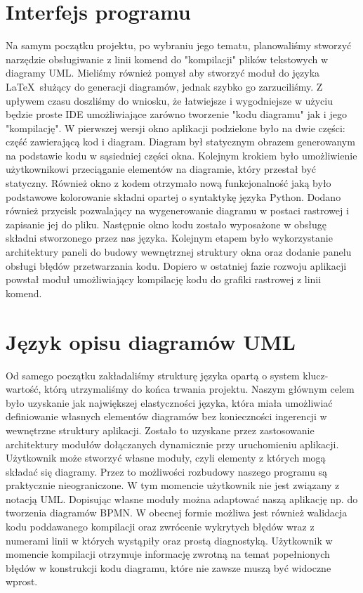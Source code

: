 \section{Interfejs programu}
Na samym początku projektu, po wybraniu jego tematu, planowaliśmy stworzyć narzędzie obsługiwanie z linii komend do "kompilacji" plików tekstowych w diagramy UML. Mieliśmy również pomysł aby stworzyć moduł do języka \LaTeX\ służący do generacji diagramów, jednak szybko go zarzuciliśmy.
Z upływem czasu doszliśmy do wniosku, że łatwiejsze i wygodniejsze w użyciu będzie proste IDE umożliwiające zarówno tworzenie "kodu diagramu" jak i jego "kompilację". W pierwszej wersji okno aplikacji podzielone było na dwie części: część zawierającą kod i diagram. Diagram był statycznym obrazem generowanym na podstawie kodu w sąsiedniej części okna.
Kolejnym krokiem było umożliwienie użytkownikowi przeciąganie elementów na diagramie, który przestał być statyczny. Również okno z kodem otrzymało nową funkcjonalność jaką było podstawowe kolorowanie składni opartej o syntaktykę języka Python. Dodano również przycisk pozwalający na wygenerowanie diagramu w postaci rastrowej i zapisanie jej do pliku.
Następnie okno kodu zostało wyposażone w obsługę składni stworzonego przez nas języka. Kolejnym etapem było wykorzystanie architektury paneli do budowy wewnętrznej struktury okna oraz dodanie panelu obsługi błędów przetwarzania kodu. Dopiero w ostatniej fazie rozwoju aplikacji powstał moduł umożliwiający kompilację kodu do grafiki rastrowej z linii komend.
\section{Język opisu diagramów UML}
Od samego początku zakładaliśmy strukturę języka opartą o system klucz-wartość, którą utrzymaliśmy do końca trwania projektu. Naszym głównym celem było uzyskanie jak największej elastyczności języka, która miała umożliwiać definiowanie własnych elementów diagramów bez konieczności ingerencji w wewnętrzne struktury aplikacji. Zostało to uzyskane przez zastosowanie architektury modułów dołączanych dynamicznie przy uruchomieniu aplikacji. Użytkownik może stworzyć własne moduły, czyli elementy z których mogą składać się diagramy. Przez to możliwości rozbudowy naszego programu są praktycznie nieograniczone. W tym momencie użytkownik nie jest związany z notacją UML. Dopisując własne moduły można adaptować naszą aplikację np. do tworzenia diagramów BPMN.
W obecnej formie możliwa jest również walidacja kodu poddawanego kompilacji oraz zwrócenie wykrytych błędów wraz z numerami linii w których wystąpiły oraz prostą diagnostyką. Użytkownik w momencie kompilacji otrzymuje informację zwrotną na temat popełnionych błędów w konstrukcji kodu diagramu, które nie zawsze muszą być widoczne wprost.
